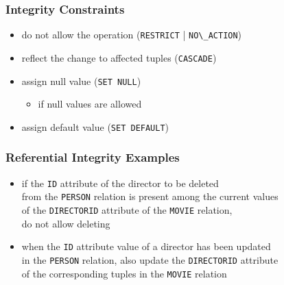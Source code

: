\documentclass[dvipsnames]{beamer}
\theoremstyle{plain}
\begin{document}
\begin{frame}
  \frametitle{Integrity Constraints}

  \begin{itemize}
    \item do not allow the operation
      (\lstinline!RESTRICT! | \lstinline!NO\_ACTION!)

    \pause
    \item reflect the change to affected tuples (\lstinline!CASCADE!)

    \pause
    \item assign null value (\lstinline!SET NULL!)
    \begin{itemize}
      \item if null values are allowed
    \end{itemize}

    \pause
    \item assign default value (\lstinline!SET DEFAULT!)
  \end{itemize}
\end{frame}

\begin{frame}[fragile]
  \frametitle{Referential Integrity Examples}

  \begin{example}
    \begin{itemize}
      \item if the \texttt{ID} attribute of the director to be deleted\\
	from the \texttt{PERSON} relation is present among the current values\\
	of the \texttt{DIRECTORID} attribute of the \texttt{MOVIE} relation,\\
	do not allow deleting
    \end{itemize}
  \end{example}

  \pause
  \begin{example}
    \begin{itemize}
      \item when the \texttt{ID} attribute value of a director has been
        updated\\
        in the \texttt{PERSON} relation, also update the \texttt{DIRECTORID}
        attribute\\
        of the corresponding tuples in the \texttt{MOVIE} relation
    \end{itemize}
  \end{example}
\end{frame}
\end{document}
